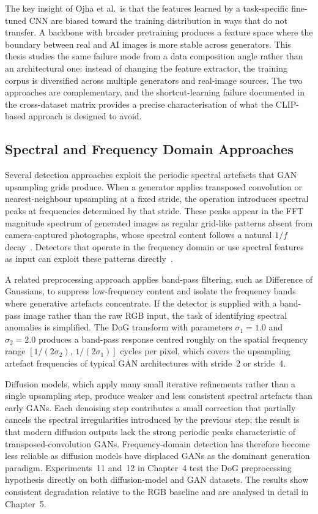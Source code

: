 The key insight of Ojha et al.\ is that the features learned by a task-specific
fine-tuned CNN are biased toward the training distribution in ways that do not transfer.
A backbone with broader pretraining produces a feature space where the boundary between
real and AI images is more stable across generators. This thesis studies the same failure
mode from a data composition angle rather than an architectural one: instead of changing
the feature extractor, the training corpus is diversified across multiple generators and
real-image sources. The two approaches are complementary, and the shortcut-learning failure
documented in the cross-dataset matrix provides a precise characterisation of what the
CLIP-based approach is designed to avoid.

\subsection{Spectral and Frequency Domain Approaches}
\label{subsec:spectral_detection}

Several detection approaches exploit the periodic spectral artefacts that GAN upsampling
grids produce. When a generator applies transposed convolution or nearest-neighbour
upsampling at a fixed stride, the operation introduces spectral peaks at frequencies
determined by that stride. These peaks appear in the FFT magnitude spectrum of generated
images as regular grid-like patterns absent from camera-captured photographs, whose
spectral content follows a natural $1/f$ decay~\cite{ruderman1994statistics}. Detectors that operate in the frequency
domain or use spectral features as input can exploit these patterns directly~\cite{zhang2019detecting,frank2020leveraging}.

A related preprocessing approach applies band-pass filtering, such as Difference of
Gaussians, to suppress low-frequency content and isolate the frequency bands where
generative artefacts concentrate. If the detector is supplied with a band-pass image
rather than the raw RGB input, the task of identifying spectral anomalies is
simplified. The DoG transform with parameters $\sigma_1 = 1.0$ and $\sigma_2 = 2.0$
produces a band-pass response centred roughly on the spatial frequency range
$[1/(2\sigma_2),\, 1/(2\sigma_1)]$ cycles per pixel, which covers the upsampling
artefact frequencies of typical GAN architectures with stride~2 or stride~4.

Diffusion models, which apply many small iterative refinements rather than a single
upsampling step, produce weaker and less consistent spectral artefacts than early GANs.
Each denoising step contributes a small correction that partially cancels the spectral
irregularities introduced by the previous step; the result is that modern diffusion
outputs lack the strong periodic peaks characteristic of transposed-convolution GANs.
Frequency-domain detection has therefore become less reliable as diffusion models have
displaced GANs as the dominant generation paradigm. Experiments~11 and~12 in Chapter~4
test the DoG preprocessing hypothesis directly on both diffusion-model and GAN datasets.
The results show consistent degradation relative to the RGB baseline and are analysed in
detail in Chapter~5.

